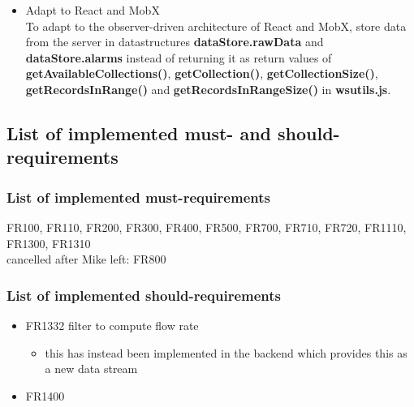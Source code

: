 \documentclass[oneside, english, final]{design}
\begin{document}
\begin{itemize}
\begin{itemize}
    \end{itemize}

  \item{Adapt to React and MobX}
    \\
    To adapt to the observer-driven architecture of React and MobX, store data from the server in datastructures \textsf{\textbf{dataStore.rawData}} and \textsf{\textbf{dataStore.alarms}}
    instead of returning it as return values of
    \textsf{\textbf{getAvailableCollections()}},
    \textsf{\textbf{getCollection()}}, \textsf{\textbf{getCollectionSize()}}, \textsf{\textbf{getRecordsInRange()}} and \textsf{\textbf{getRecordsInRangeSize()}} in \textsf{\textbf{wsutils.js}}.

\end{itemize}

\newpage

\subsection{List of implemented must- and should-requirements}
\subsubsection{List of implemented must-requirements}
FR100, FR110, FR200, FR300, FR400, FR500, FR700, FR710, FR720, FR1110, FR1300, FR1310
\\
cancelled after Mike left: FR800

\subsubsection{List of implemented should-requirements}
\begin{itemize}
  \item{FR1332 filter to compute flow rate}
  \begin{itemize}
    \item{this has instead been implemented in the backend which provides this as a new data stream}
  \end{itemize}
  \item{FR1400}
\end{itemize}
\end{document}
